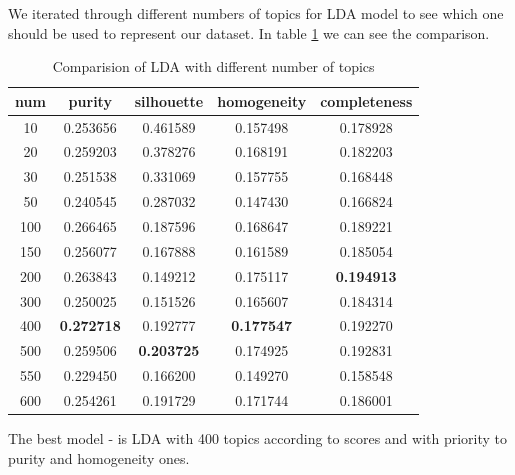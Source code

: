 \documentclass[11pt]{article}
\begin{document}
We iterated through different numbers of topics for LDA model to see which one should be used to represent our dataset. In table \ref{LDA_num_topic} we can see the comparison. 

\begin{table}[htb]
\begin{center}
\begin{tabular}{ |c|c|c|c|c| }
\hline
num & purity  & silhouette  & homogeneity  & completeness \\ \hline 
10  & 0.253656  & 0.461589  & 0.157498  & 0.178928  \\ \hline 
20  & 0.259203  & 0.378276  & 0.168191  & 0.182203  \\ \hline 
30  & 0.251538  & 0.331069  & 0.157755  & 0.168448  \\ \hline 
50  & 0.240545  & 0.287032  & 0.147430  & 0.166824  \\ \hline 
100  & 0.266465  & 0.187596  & 0.168647  & 0.189221 \\ \hline 
150  & 0.256077  & 0.167888  & 0.161589  & 0.185054 \\ \hline 
200  & 0.263843  & 0.149212  & 0.175117  & \textbf{0.194913} \\ \hline 
300  & 0.250025  & 0.151526  & 0.165607  & 0.184314 \\ \hline 
400  & \textbf{0.272718}  & 0.192777  & \textbf{0.177547}  & 0.192270 \\ \hline 
500  & 0.259506  & \textbf{0.203725}  & 0.174925  & 0.192831 \\ \hline 
550  & 0.229450  & 0.166200  & 0.149270  & 0.158548 \\ \hline 
600  & 0.254261  & 0.191729  & 0.171744  & 0.186001 \\
\hline 
\end{tabular}
\caption{Comparision of LDA with different number of topics}
\label{LDA_num_topic}
\end{center}
\end{table}
\FloatBarrier

The best model - is LDA with 400 topics according to scores and with priority to purity and homogeneity ones.
\end{document}
